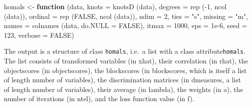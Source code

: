 \documentclass[
  12pt,
  letterpaper,
]{scrbook}
\newenvironment{Shaded}{\begin{snugshade}}{\end{snugshade}}
\newcommand{\AttributeTok}[1]{\textcolor[rgb]{0.40,0.45,0.13}{#1}}
\newcommand{\ConstantTok}[1]{\textcolor[rgb]{0.56,0.35,0.01}{#1}}
\newcommand{\ControlFlowTok}[1]{\textcolor[rgb]{0.00,0.23,0.31}{\textbf{#1}}}
\newcommand{\DecValTok}[1]{\textcolor[rgb]{0.68,0.00,0.00}{#1}}
\newcommand{\FloatTok}[1]{\textcolor[rgb]{0.68,0.00,0.00}{#1}}
\newcommand{\FunctionTok}[1]{\textcolor[rgb]{0.28,0.35,0.67}{#1}}
\newcommand{\NormalTok}[1]{\textcolor[rgb]{0.00,0.23,0.31}{#1}}
\newcommand{\OtherTok}[1]{\textcolor[rgb]{0.00,0.23,0.31}{#1}}
\newcommand{\SpecialCharTok}[1]{\textcolor[rgb]{0.37,0.37,0.37}{#1}}
\newcommand{\StringTok}[1]{\textcolor[rgb]{0.13,0.47,0.30}{#1}}
\begin{document}
\begin{Shaded}
\begin{Highlighting}[]
\NormalTok{homals }\OtherTok{\textless{}{-}}
  \ControlFlowTok{function}\NormalTok{ (data,}
            \AttributeTok{knots =} \FunctionTok{knotsD}\NormalTok{ (data),}
            \AttributeTok{degrees =} \FunctionTok{rep}\NormalTok{ (}\SpecialCharTok{{-}}\DecValTok{1}\NormalTok{, }\FunctionTok{ncol}\NormalTok{ (data)),}
            \AttributeTok{ordinal =} \FunctionTok{rep}\NormalTok{ (}\ConstantTok{FALSE}\NormalTok{, }\FunctionTok{ncol}\NormalTok{ (data)),}
            \AttributeTok{ndim =} \DecValTok{2}\NormalTok{,}
            \AttributeTok{ties =} \StringTok{"s"}\NormalTok{,}
            \AttributeTok{missing =} \StringTok{"m"}\NormalTok{,}
            \AttributeTok{names =} \FunctionTok{colnames}\NormalTok{ (data, }\AttributeTok{do.NULL =} \ConstantTok{FALSE}\NormalTok{),}
            \AttributeTok{itmax =} \DecValTok{1000}\NormalTok{,}
            \AttributeTok{eps =} \FloatTok{1e{-}6}\NormalTok{,}
            \AttributeTok{seed =} \DecValTok{123}\NormalTok{,}
            \AttributeTok{verbose =} \ConstantTok{FALSE}\NormalTok{)}
\end{Highlighting}
\end{Shaded}

The output is a structure of class \texttt{homals}, i.e.~a list with a
class attribute\texttt{homals}. The list consists of transformed
variables (in xhat), their correlation (in rhat), the objectscores (in
objectscores), the blockscores (in blockscores, which is itself a list
of length number of variables), the discrimination matrices (in
dmeasures, a list of length number of variables), their average (in
lambda), the weights (in a), the number of iterations (in ntel), and the
loss function value (in f).

\begin{Shaded}
\end{Shaded}
\end{document}
